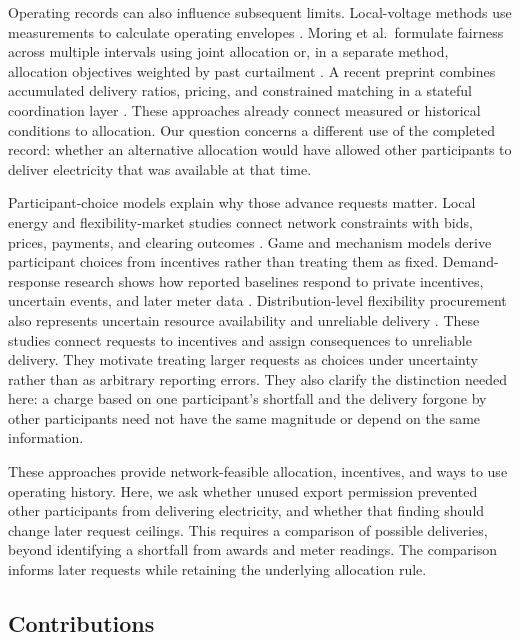 \documentclass[twoside,twocolumn,9pt]{article}
\begin{document}
Operating records can also influence subsequent limits. Local-voltage methods
use measurements to calculate operating envelopes
\cite{hashmi2023localvoltage}. Moring et al.\ formulate fairness across multiple
intervals using joint allocation or, in a separate method, allocation
objectives weighted by past curtailment
\cite{moring2024fairovertime}. A recent preprint combines accumulated delivery
ratios, pricing, and constrained matching in a stateful coordination layer
\cite{sweeney2026stateful}. These approaches already connect measured or
historical conditions to allocation. Our question concerns a different use of
the completed record: whether an alternative allocation would have allowed
other participants to deliver electricity that was available at that time.

Participant-choice models explain why those advance requests matter. Local
energy and flexibility-market studies connect network constraints with bids,
prices, payments, and clearing outcomes
\cite{chen2022energy,tsaousoglou2021mechanism,
belgioioso2021operationally}. Game and mechanism models derive participant
choices from incentives rather than treating them as fixed. Demand-response
research shows how reported baselines respond to private incentives, uncertain
events, and later meter data
\cite{ellman2021baseline,wang2022baseline,wang2021selfreported}.
Distribution-level flexibility procurement also represents uncertain resource
availability and unreliable delivery
\cite{tsaousoglou2021uncertainty,essayeh2025stochastic,
mallaki2021strategic,anaya2021flexibility}. These studies connect requests to
incentives and assign consequences to unreliable delivery. They motivate
treating larger requests as choices under uncertainty rather than as arbitrary
reporting errors. They also clarify the distinction needed here: a charge
based on one participant's shortfall and the delivery forgone by other
participants need not have the same magnitude or depend on the same information.

These approaches provide network-feasible allocation, incentives, and ways to
use operating history. Here, we ask whether unused export permission prevented
other participants from delivering electricity, and whether that finding
should change later request ceilings. This requires a comparison of possible
deliveries, beyond identifying a shortfall from awards and meter readings.
The comparison informs later requests while retaining the underlying allocation rule.

\subsection{Contributions}
\end{document}
